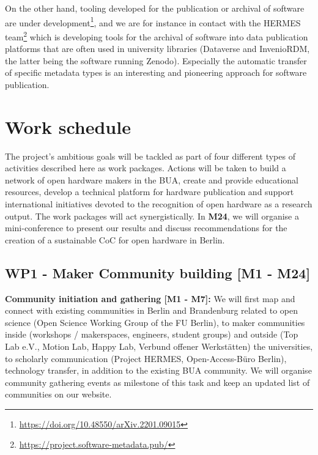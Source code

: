 \documentclass[
  12pt,
  a4paper,
]{article}
\begin{document}
On the other hand, tooling developed for the publication or archival of
software are under development\footnote{\url{https://doi.org/10.48550/arXiv.2201.09015}},
and we are for instance in contact with the HERMES team\footnote{\url{https://project.software-metadata.pub/}}
which is developing tools for the archival of software into data
publication platforms that are often used in university libraries
(Dataverse and InvenioRDM, the latter being the software running
Zenodo). Especially the automatic transfer of specific metadata types is
an interesting and pioneering approach for software publication.

\hypertarget{work-schedule}{%
\section{Work schedule}\label{work-schedule}}

The project's ambitious goals will be tackled as part of four different
types of activities described here as work packages. Actions will be
taken to build a network of open hardware makers in the BUA, create and
provide educational resources, develop a technical platform for hardware
publication and support international initiatives devoted to the
recognition of open hardware as a research output. The work packages
will act synergistically. In \textbf{M24}, we will organise a
mini-conference to present our results and discuss recommendations for
the creation of a sustainable CoC for open hardware in Berlin.

\hypertarget{wp1---maker-community-building-m1---m24}{%
\subsection{WP1 - Maker Community building {[}M1 -
M24{]}}\label{wp1---maker-community-building-m1---m24}}

\textbf{Community initiation and gathering {[}M1 - M7{]}:} We will first
map and connect with existing communities in Berlin and Brandenburg
related to open science (Open Science Working Group of the FU Berlin),
to maker communities inside (workshops / makerspaces, engineers, student
groups) and outside (Top Lab e.V., Motion Lab, Happy Lab, Verbund
offener Werkstätten) the universities, to scholarly communication
(Project HERMES, Open-Access-Büro Berlin), technology transfer, in
addition to the existing BUA community. We will organise community
gathering events as milestone of this task and keep an updated list of
communities on our website.
\end{document}
